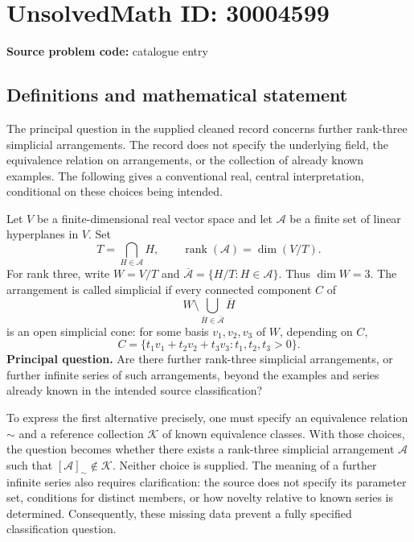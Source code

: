 \documentclass[11pt]{article}
\begin{document}
\section*{UnsolvedMath ID: 30004599}
\textbf{Source problem code:} catalogue entry
\subsection{Definitions and mathematical statement}
The principal question in the supplied cleaned record concerns further rank-three simplicial arrangements. The record does not specify the underlying field, the equivalence relation on arrangements, or the collection of already known examples. The following gives a conventional real, central interpretation, conditional on these choices being intended.

Let \(V\) be a finite-dimensional real vector space and let \(\mathcal A\) be a finite set of linear hyperplanes in \(V\). Set
\[
T=\bigcap_{H\in\mathcal A}H,
\qquad \operatorname{rank}(\mathcal A)=\dim(V/T).
\]
For rank three, write \(W=V/T\) and \(\overline{\mathcal A}=\{H/T:H\in\mathcal A\}\). Thus \(\dim W=3\). The arrangement is called simplicial if every connected component \(C\) of
\[
W\setminus\bigcup_{\overline H\in\overline{\mathcal A}}\overline H
\]
is an open simplicial cone: for some basis \(v_1,v_2,v_3\) of \(W\), depending on \(C\),
\[
C=\{t_1v_1+t_2v_2+t_3v_3:t_1,t_2,t_3>0\}.
\]
\textbf{Principal question.} Are there further rank-three simplicial arrangements, or further infinite series of such arrangements, beyond the examples and series already known in the intended source classification?

To express the first alternative precisely, one must specify an equivalence relation \(\sim\) and a reference collection \(\mathscr K\) of known equivalence classes. With those choices, the question becomes whether there exists a rank-three simplicial arrangement \(\mathcal A\) such that \([\mathcal A]_{\sim}\notin\mathscr K\). Neither choice is supplied. The meaning of a further infinite series also requires clarification: the source does not specify its parameter set, conditions for distinct members, or how novelty relative to known series is determined. Consequently, these missing data prevent a fully specified classification question.
\end{document}
